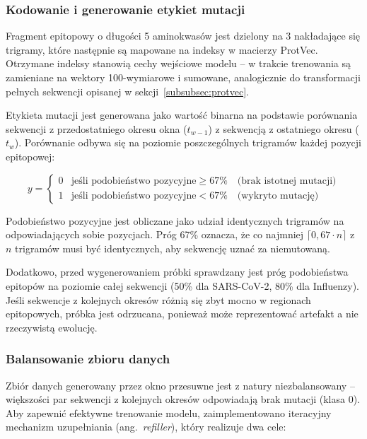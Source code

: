 \subsubsection{Kodowanie i generowanie etykiet mutacji}
\label{subsubsec:kodowanie}

Fragment epitopowy o długości 5 aminokwasów jest dzielony na 3 nakładające się trigramy, które następnie są mapowane na indeksy w macierzy ProtVec. Otrzymane indeksy stanowią cechy wejściowe modelu -- w trakcie trenowania są zamieniane na wektory 100-wymiarowe i sumowane, analogicznie do transformacji pełnych sekwencji opisanej w sekcji~\ref{subsubsec:protvec}.

Etykieta mutacji jest generowana jako wartość binarna na podstawie porównania sekwencji z przedostatniego okresu okna ($t_{w-1}$) z sekwencją z ostatniego okresu ($t_w$). Porównanie odbywa się na poziomie poszczególnych trigramów każdej pozycji epitopowej:

\begin{equation}
\label{eq:mutation-label}
y =
\begin{cases}
0 & \text{jeśli podobieństwo pozycyjne} \geq 67\% \quad \text{(brak istotnej mutacji)} \\
1 & \text{jeśli podobieństwo pozycyjne} < 67\% \quad \text{(wykryto mutację)}
\end{cases}
\end{equation}

\noindent Podobieństwo pozycyjne jest obliczane jako udział identycznych trigramów na odpowiadających sobie pozycjach. Próg 67\% oznacza, że co najmniej $\lceil 0{,}67 \cdot n \rceil$ z $n$ trigramów musi być identycznych, aby sekwencję uznać za niemutowaną.

Dodatkowo, przed wygenerowaniem próbki sprawdzany jest próg podobieństwa epitopów na poziomie całej sekwencji (50\% dla SARS-CoV-2, 80\% dla Influenzy). Jeśli sekwencje z kolejnych okresów różnią się zbyt mocno w regionach epitopowych, próbka jest odrzucana, ponieważ może reprezentować artefakt a nie rzeczywistą ewolucję.

\subsubsection{Balansowanie zbioru danych}
\label{subsubsec:balansowanie}

Zbiór danych generowany przez okno przesuwne jest z natury niezbalansowany -- większości par sekwencji z kolejnych okresów odpowiadają brak mutacji (klasa 0). Aby zapewnić efektywne trenowanie modelu, zaimplementowano iteracyjny mechanizm uzupełniania (ang.~\emph{refiller}), który realizuje dwa cele:

